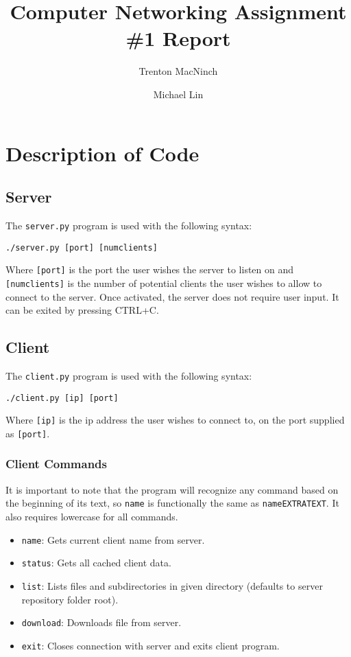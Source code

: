 \documentclass{article}
\title{\textbf{Computer Networking Assignment \#1 Report}}
\author{Trenton MacNinch \and Michael Lin}
\begin{document}
\maketitle

\section{Description of Code}
\subsection{Server}
The \texttt{server.py} program is used with the following syntax:

\texttt{./server.py [port] [numclients]}

Where \texttt{[port]} is the port the user wishes the server to listen on and \texttt{[numclients]} is the number of potential clients the user wishes to allow to connect to the server. Once activated, the server does not require user input. It can be exited by pressing CTRL+C.

\subsection{Client}
The \texttt{client.py} program is used with the following syntax:

\texttt{./client.py [ip] [port]}

Where \texttt{[ip]} is the ip address the user wishes to connect to, on the port supplied as \texttt{[port]}.

\subsubsection{Client Commands}
It is important to note that the program will recognize any command based on the beginning of its text, so \texttt{name} is functionally the same as \texttt{nameEXTRATEXT}. It also requires lowercase for all commands.
\begin{itemize}
	\item \texttt{name}: Gets current client name from server.
	\item \texttt{status}: Gets all cached client data.
	\item \texttt{list}: Lists files and subdirectories in given directory (defaults to server repository folder root).
	\item \texttt{download}: Downloads file from server.
	\item \texttt{exit}: Closes connection with server and exits client program.
\end{itemize}
\end{document}
